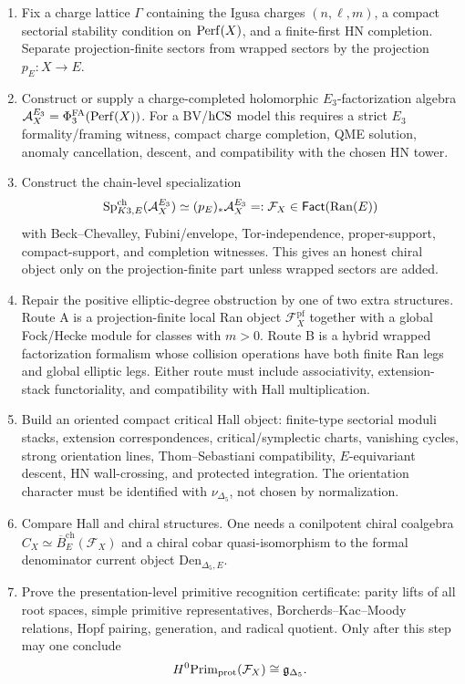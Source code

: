 \begin{enumerate}
\item Fix a charge lattice \(\Gamma\) containing the Igusa charges
\((n,\ell,m)\), a compact sectorial stability condition on
\(\mathrm{Perf}(X)\), and a finite-first HN completion.  Separate
projection-finite sectors from wrapped sectors by the projection
\(p_E\colon X\to E\).

\item Construct or supply a charge-completed holomorphic
\(E_3\)-factorization algebra
\(\mathcal A_X^{E_3}=\Phi^{\mathrm{FA}}_3(\mathrm{Perf}(X))\).  For a BV/\(\mathrm{hCS}\) model this
requires a strict \(E_3\) formality/framing witness, compact charge
completion, QME solution, anomaly cancellation, descent, and
compatibility with the chosen HN tower.

\item Construct the chain-level specialization
\[
       \mathrm{Sp}^{\mathrm{ch}}_{K3,E}(\mathcal A_X^{E_3})
          \simeq (p_E)_*\mathcal A_X^{E_3}
          =: \mathcal F_X
          \in \mathsf{Fact}(\mathrm{Ran}(E))
\]
with Beck--Chevalley, Fubini/envelope, Tor-independence, proper-support,
compact-support, and completion witnesses.  This gives an honest chiral
object only on the projection-finite part unless wrapped sectors are
added.

\item Repair the positive elliptic-degree obstruction by one of two
extra structures.  Route A is a projection-finite local Ran object
\(\mathcal F_X^{\mathrm{pf}}\) together with a global Fock/Hecke module
for classes with \(m>0\).  Route B is a hybrid wrapped factorization
formalism whose collision operations have both finite Ran legs and
global elliptic legs.  Either route must include associativity,
extension-stack functoriality, and compatibility with Hall
multiplication.

\item Build an oriented compact critical Hall object:
finite-type sectorial moduli stacks, extension correspondences,
critical/symplectic charts, vanishing cycles, strong orientation lines,
Thom--Sebastiani compatibility, \(E\)-equivariant descent, HN
wall-crossing, and protected integration.  The orientation character
must be identified with \(\nu_{\Delta_5}\), not chosen by normalization.

\item Compare Hall and chiral structures.  One needs a conilpotent
chiral coalgebra \(C_X\simeq \overline B^{\mathrm{ch}}_E(\mathcal F_X)\)
and a chiral cobar quasi-isomorphism to the formal denominator current
object \(\mathrm{Den}_{\Delta_5,E}\).

\item Prove the presentation-level primitive recognition certificate:
parity lifts of all root spaces, simple primitive representatives,
Borcherds--Kac--Moody relations, Hopf pairing, generation, and radical
quotient.  Only after this step may one conclude
\[
       H^0\mathrm{Prim}_{\mathrm{prot}}(\mathcal F_X)\cong \mathfrak g_{\Delta_5} .
\]
\end{enumerate}

